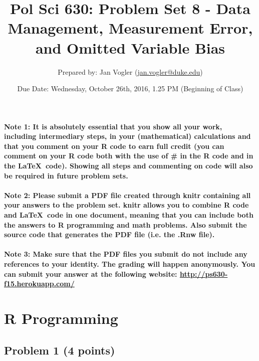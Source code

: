 \documentclass[12pt]{article}
\begin{document}
\title{Pol Sci 630: Problem Set 8 - Data Management, Measurement Error, and Omitted Variable Bias}

\author{Prepared by: Jan Vogler (\href{mailto:jan.vogler@duke.edu}{jan.vogler@duke.edu})}

\date{Due Date: Wednesday, October 26th, 2016, 1.25 PM (Beginning of Class)}
 
\maketitle 



\paragraph{Note 1: It is absolutely essential that you show all your work, including intermediary steps, in your (mathematical) calculations and that you comment on your R code to earn full credit (you can comment on your R code both with the use of \# in the R code and in the \LaTeX \ code). Showing all steps and commenting on code will also be required in future problem sets.}

\paragraph{Note 2: Please submit a PDF file created through knitr containing all your answers to the problem set. knitr allows you to combine R code and \LaTeX \ code in one document, meaning that you can include both the answers to R programming and math problems. Also submit the source code that generates the PDF file (i.e. the .Rnw file).}

\paragraph{Note 3: Make sure that the PDF files you submit do not include any references to your identity. The grading will happen anonymously. You can submit your answer at the following website: \url{http://ps630-f15.herokuapp.com/}}



\section*{R Programming}

\subsection*{Problem 1 (4 points)}
\end{document}
